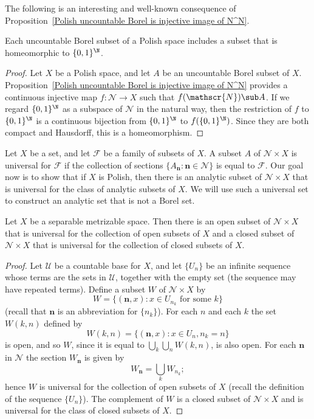 The following is an interesting and well-known consequence of Proposition~\ref{Polish uncountable Borel is injective image of N^N}.
\begin{corollary}\label{Polish uncountable Borel contain {0,1}^N}
Each uncountable Borel subset of a Polish space includes a subset that is homeomorphic to $\{0,1\}^\N$.
\end{corollary}
\begin{proof}
Let $X$ be a Polish space, and let $A$ be an uncountable Borel subset of $X$. Proposition~\ref{Polish uncountable Borel is injective image of N^N} provides a continuous injective map $f:\mathscr{N}\to X$ such that $f(\mathscr{N})\sub A$. If we regard $\{0,1\}^\N$ as a subspace of $\mathscr{N}$ in the natural way, then the restriction of $f$ to $\{0,1\}^\N$ is a continuous bijection from $\{0,1\}^\N$ to $f(\{0,1\}^\N)$. Since they are both compact and Hausdorff, this is a homeomorphism.
\end{proof}
Let $X$ be a set, and let $\mathcal{F}$ be a family of subsets of $X$. A subset $A$ of $\mathscr{N}\times X$ is universal for $\mathcal{F}$ if the collection of sections $\{A_{\mathbf{n}}:\mathbf{n}\in\mathscr{N}\}$ is equal to $\mathcal{F}$. Our goal now is to show that if $X$ is Polish, then there is an analytic subset of $\mathscr{N}\times X$ that is universal for the class of analytic subsets of $X$. We will use such a
universal set to construct an analytic set that is not a Borel set.
\begin{lemma}\label{Polish universal open universal closed}
Let $X$ be a separable metrizable space. Then there is an open subset of $\mathscr{N}\times X$ that is universal for the collection of open subsets of $X$ and a closed subset of $\mathscr{N}\times X$ that is universal for the collection of closed subsets of $X$.
\end{lemma}
\begin{proof}
Let $\mathcal{U}$ be a countable base for $X$, and let $\{U_n\}$ be an infinite sequence whose terms are the sets in $\mathcal{U}$, together with the empty set (the sequence may have repeated terms). Define a subset $W$ of $\mathscr{N}\times X$ by
\[W=\{(\mathbf{n},x):x\in U_{n_k}\text{ for some $k$}\}\]
(recall that $\mathbf{n}$ is an abbreviation for $\{n_k\}$). For each $n$ and each $k$ the set $W(k,n)$ defined by
\[W(k,n)=\{(\mathbf{n},x):x\in U_n,n_k=n\}\]
is open, and so $W$, since it is equal to $\bigcup_k\bigcup_nW(k,n)$, is also open. For each $\mathbf{n}$ in $\mathscr{N}$ the section $W_{\mathbf{n}}$ is given by
\[W_{\mathbf{n}}=\bigcup_{k}W_{n_k};\]
hence $W$ is universal for the collection of open subsets of $X$ (recall the definition of the sequence $\{U_n\}$). The complement of $W$ is a closed subset of $\mathscr{N}\times X$ and is universal for the class of closed subsets of $X$.
\end{proof}
